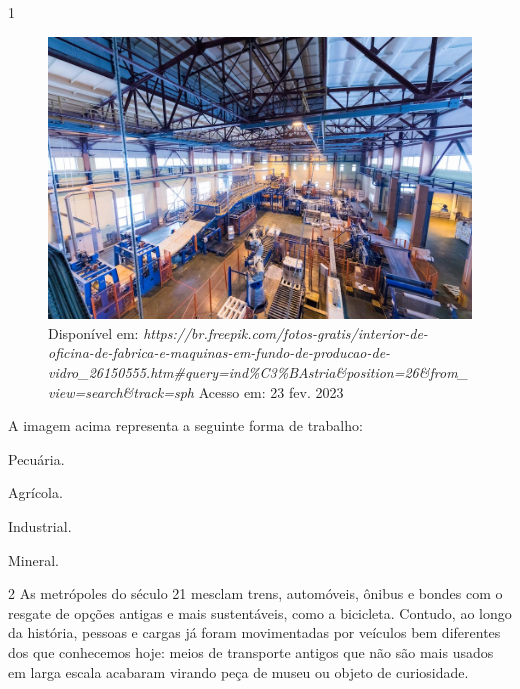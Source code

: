

\num{1}

\begin{figure}[htpb!]
\includegraphics[width=.5\textwidth]{./imgs/img64.png}
\caption{Disponível em: \emph{https://br.freepik.com/fotos-gratis/interior-de-oficina-de-fabrica-e-maquinas-em-fundo-de-producao-de-vidro\_26150555.htm\#query=ind\%C3\%BAstria\&position=26\&from\_view=search\&track=sph} Acesso em: 23 fev. 2023}
\end{figure}

A imagem acima representa a seguinte forma de trabalho:

\begin{escolha}
\item Pecuária.

\item Agrícola.

\item Industrial.

\item Mineral.
\end{escolha}


\num{2} As metrópoles do século 21 mesclam trens, automóveis, ônibus e bondes
com o resgate de opções antigas e mais sustentáveis, como a bicicleta.
Contudo, ao longo da história, pessoas e cargas já foram movimentadas
por veículos bem diferentes dos que conhecemos hoje: meios de transporte
antigos que não são mais usados em larga escala acabaram virando peça de
museu ou objeto de curiosidade.

